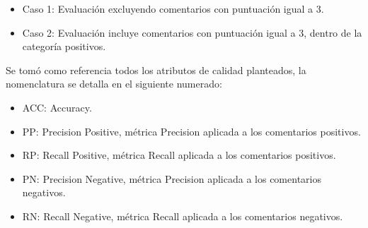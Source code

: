\documentclass[12pt]{article}
\begin{document}
\begin{itemize}
  \item Caso 1: Evaluación excluyendo comentarios con puntuación igual a 3.
  \item Caso 2: Evaluación incluye comentarios con puntuación igual a 3, dentro de la categoría positivos.
\end{itemize}
Se tomó como referencia todos los atributos de calidad planteados, la nomenclatura se detalla en el siguiente numerado:
\begin{itemize}
  \item ACC: Accuracy.
  \item PP: Precision Positive, métrica Precision aplicada a los comentarios positivos.
  \item RP: Recall Positive, métrica Recall aplicada a los comentarios positivos.
  \item PN: Precision Negative, métrica Precision aplicada a los comentarios negativos.
  \item RN: Recall Negative, métrica Recall aplicada a los comentarios negativos.
\end{itemize}
\end{document}
